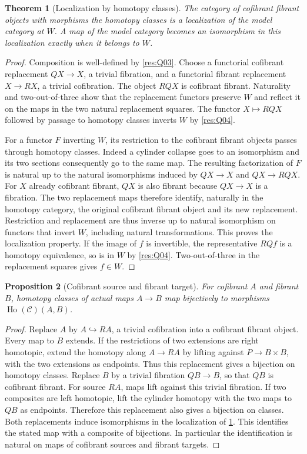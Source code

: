 \documentclass[11pt,oneside,openany]{book}
\newtheorem{theorem}{Theorem}[chapter]
\newtheorem{proposition}[theorem]{Proposition}
\theoremstyle{definition}
\theoremstyle{remark}
\begin{document}
\begin{theorem}[Localization by homotopy classes]\label{res:Q05}
The category of cofibrant fibrant objects with morphisms the
homotopy classes is a localization of the model category at
\(W\). A map of the model category becomes an isomorphism
in this localization exactly when it belongs to \(W\).
\end{theorem}
\begin{proof}
Composition is well-defined by \ref{res:Q03}. Choose a
functorial cofibrant replacement \(QX\to X\), a trivial
fibration, and a functorial fibrant replacement \(X\to RX\),
a trivial cofibration. The object \(RQX\) is cofibrant
fibrant. Naturality and two-out-of-three show that the
replacement functors preserve \(W\) and reflect it on
the maps in the two natural replacement squares.
The functor \(X\mapsto RQX\) followed by passage to homotopy
classes inverts \(W\) by \ref{res:Q04}.

For a functor \(F\) inverting \(W\), its restriction to the
cofibrant fibrant objects passes through homotopy classes.
Indeed a cylinder collapse goes to an isomorphism and its two
sections consequently go to the same map. The resulting
factorization of \(F\) is natural up to the natural
isomorphisms induced by \(QX\to X\) and \(QX\to RQX\).
For \(X\) already cofibrant fibrant, \(QX\) is also fibrant
because \(QX\to X\) is a fibration. The two replacement maps
therefore identify, naturally in the homotopy category,
the original cofibrant fibrant object and its new replacement.
Restriction and replacement are thus inverse up to natural
isomorphism on functors that invert \(W\), including natural
transformations. This proves the localization property.
If the image of \(f\) is invertible, the representative
\(RQf\) is a homotopy equivalence, so is in \(W\) by
\ref{res:Q04}. Two-out-of-three in the replacement squares
gives \(f\in W\).
\end{proof}

\begin{proposition}[Cofibrant source and fibrant target]\label{res:Q06}
For cofibrant \(A\) and fibrant \(B\), homotopy classes of
actual maps \(A\to B\) map bijectively to morphisms
\(\operatorname{Ho}(\mathcal C)(A,B)\).
\end{proposition}
\begin{proof}
Replace \(A\) by \(A\hookrightarrow RA\), a trivial
cofibration into a cofibrant fibrant object. Every map to
\(B\) extends. If the restrictions of two extensions are
right homotopic, extend the homotopy along \(A\to RA\)
by lifting against \(P\to B\times B\), with the two
extensions as endpoints. Thus this replacement gives a
bijection on homotopy classes. Replace \(B\) by a trivial
fibration \(QB\to B\), so that \(QB\) is cofibrant
fibrant. For source \(RA\), maps lift against this
trivial fibration. If two composites are left homotopic,
lift the cylinder homotopy with the two maps to \(QB\)
as endpoints. Therefore this replacement also gives a
bijection on classes. Both replacements induce
isomorphisms in the localization of \ref{res:Q05}.
This identifies the stated map with a composite of
bijections. In particular the identification is natural
on maps of cofibrant sources and fibrant targets.
\end{proof}
\end{document}
